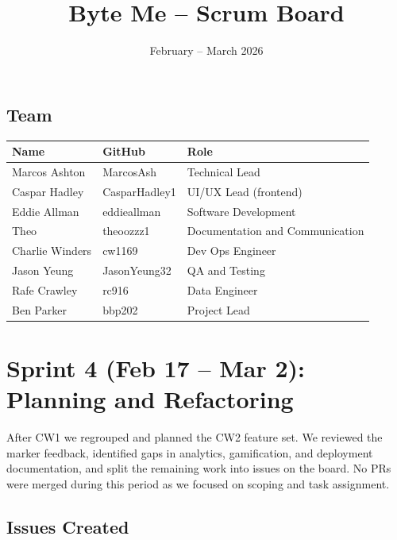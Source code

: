 \documentclass[a4paper,11pt]{article}
\title{Byte Me -- Scrum Board}
\date{February -- March 2026}
\author{}
\begin{document}
\maketitle

\subsection*{Team}

\begin{tabular}{l l l}
\toprule
Name & GitHub & Role \\
\midrule
Marcos Ashton & MarcosAsh & Technical Lead \\
Caspar Hadley & CasparHadley1 & UI/UX Lead (frontend) \\
Eddie Allman & eddieallman & Software Development \\
Theo & theoozzz1 & Documentation and Communication \\
Charlie Winders & cw1169 & Dev Ops Engineer \\
Jason Yeung & JasonYeung32 & QA and Testing \\
Rafe Crawley & rc916 & Data Engineer \\
Ben Parker & bbp202 & Project Lead \\
\bottomrule
\end{tabular}

\section*{Sprint 4 (Feb 17 -- Mar 2): Planning and Refactoring}

After CW1 we regrouped and planned the CW2 feature set. We reviewed the marker feedback, identified gaps in analytics, gamification, and deployment documentation, and split the remaining work into issues on the board. No PRs were merged during this period as we focused on scoping and task assignment.

\subsection*{Issues Created}
\end{document}
